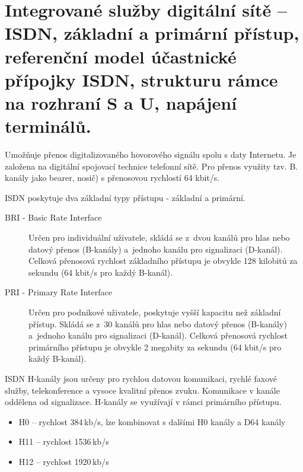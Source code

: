 \clearpage

\section{Integrované služby digitální sítě -- ISDN, základní a primární přístup, referenční model účastnické přípojky ISDN, strukturu rámce na rozhraní S a U, napájení terminálů.}
Umožňuje přenos digitalizovaného hovorového signálu spolu s daty Internetu. Je založena na digitální spojovací technice telefonní sítě.
Pro přenos využity tzv. B. kanály jako bearer, nosič) s přenosovou rychlostí 64 kbit/s.

ISDN poskytuje dva základní typy přístupu - základní a primární.
\begin{description}
    \item[BRI - Basic Rate Interface] Určen pro individuální uživatele, skládá se z~dvou kanálů pro hlas nebo datový přenos (B-kanály) a~jednoho kanálu pro signalizaci (D-kanál). Celková přenosová rychlost základního přístupu je obvykle 128 kilobitů za sekundu (64 kbit/s pro každý B-kanál).
    \item[PRI - Primary Rate Interface] Určen pro podnikové uživatele, poskytuje vyšší kapacitu než základní přístup. Skládá se z~30 kanálů pro hlas nebo datový přenos (B-kanály) a~jednoho kanálu pro signalizaci (D-kanál). Celková přenosová rychlost primárního přístupu je obvykle 2 megabity za sekundu (64 kbit/s pro každý B-kanál).
\end{description}

ISDN H-kanály jsou určeny pro rychlou datovou komunikaci, rychlé faxové služby, telekonference a vysoce kvalitní přenos zvuku. Komunikace v kanále oddělena od signalizace. H-kanály se využívají v rámci primárního přístupu.
\begin{itemize}
    \item H0 -- rychlost 384\,kb/s, lze kombinovat s dalšími H0 kanály a D64 kanály
    \item H11 -- rychlost 1536\,kb/s
    \item H12 -- rychlost 1920\,kb/s
\end{itemize}

